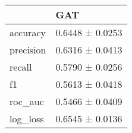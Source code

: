 \begin{tabular}{ll}
\toprule
 & GAT \\
\midrule
accuracy & 0.6448 ± 0.0253 \\
precision & 0.6316 ± 0.0413 \\
recall & 0.5790 ± 0.0256 \\
f1 & 0.5613 ± 0.0418 \\
roc_auc & 0.5466 ± 0.0409 \\
log_loss & 0.6545 ± 0.0136 \\
\bottomrule
\end{tabular}
